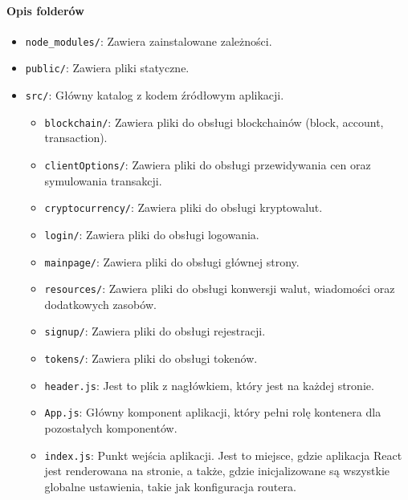 \paragraph{Opis folderów}
\begin{itemize}
    \item \texttt{node\_modules/}: Zawiera zainstalowane zależności.
    \item \texttt{public/}: Zawiera pliki statyczne.
    \item \texttt{src/}: Główny katalog z kodem źródłowym aplikacji.
    \begin{itemize}
        \item \texttt{blockchain/}: Zawiera pliki do obsługi blockchainów (block, account, transaction).
        \item \texttt{clientOptions/}: Zawiera pliki do obsługi przewidywania cen oraz symulowania transakcji.
        \item \texttt{cryptocurrency/}: Zawiera pliki do obsługi kryptowalut.
        \item \texttt{login/}: Zawiera pliki do obsługi logowania.
        \item \texttt{mainpage/}: Zawiera pliki do obsługi głównej strony.
        \item \texttt{resources/}: Zawiera pliki do obsługi konwersji walut, wiadomości oraz dodatkowych zasobów.
        \item \texttt{signup/}: Zawiera pliki do obsługi rejestracji.
        \item \texttt{tokens/}: Zawiera pliki do obsługi tokenów.
        \item \texttt{header.js}: Jest to plik z nagłówkiem, który jest na każdej stronie.
        \item \texttt{App.js}: Główny komponent aplikacji, który pełni rolę kontenera dla pozostałych komponentów.
        \item \texttt{index.js}: Punkt wejścia aplikacji. Jest to miejsce, gdzie aplikacja React jest renderowana na stronie, a także, gdzie inicjalizowane są wszystkie globalne ustawienia, takie jak konfiguracja routera.
    \end{itemize}
\end{itemize}


